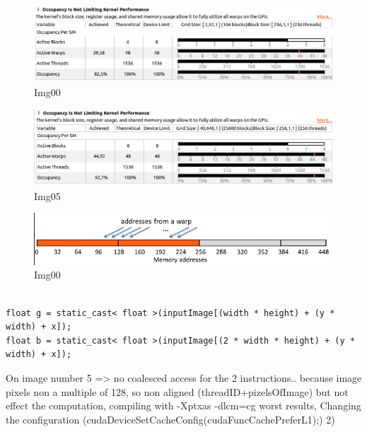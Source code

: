 \documentclass[a4paper]{article}
\begin{document}
\begin{figure}[ht]
    \centering
    \includegraphics[width=0.7\linewidth]{profiling/darker/darker_occupancy_00}
    \caption{Img00}
    \label{fig:occ00}
\end{figure}
\FloatBarrier

\begin{figure}[ht]
    \centering
    \includegraphics[width=0.7\linewidth]{profiling/darker/darker_06_occupancy}
    \caption{Img05}
    \label{fig:occ06}
\end{figure}
\FloatBarrier

\begin{figure}[ht]
    \centering
    \includegraphics[width=0.7\linewidth]{profiling/darker/unaligned_load}
    \caption{Img00}
    \label{fig:unlo}
\end{figure}
\FloatBarrier

\begin{lstlisting}[label=loop, caption=Unaligned accesses]

float g = static_cast< float >(inputImage[(width * height) + (y * width) + x]);
float b = static_cast< float >(inputImage[(2 * width * height) + (y * width) + x]);

\end{lstlisting}
\FloatBarrier

 






On image number 5 => no coalesced access for the 2 instructions.. because image pixels non a multiple of 128, so non aligned (threadID+pizelsOfImage) but not effect the computation, compiling with -Xptxas -dlcm=cg worst results, Changing the configuration (cudaDeviceSetCacheConfig(cudaFuncCachePreferL1);)
2) 
\end{document}
